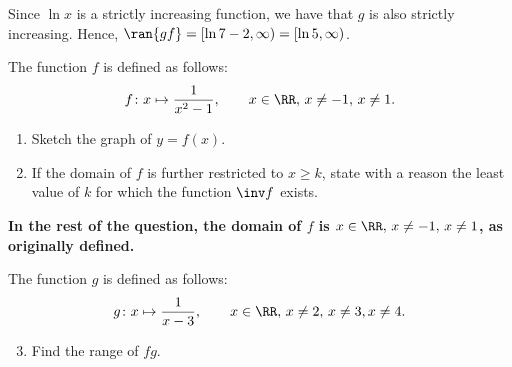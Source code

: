 \begin{solution}
\begin{ppart}
        Since $\ln x$ is a strictly increasing function, we have that $g$ is also strictly increasing. Hence, $\ran{gf} = [\ln{7 - 2}, \infty) = [\ln 5, \infty)$.
    \end{ppart}
\end{solution}

\begin{problem}
    The function $f$ is defined as follows: \[f \colon x \mapsto \frac1{x^2 - 1}, \qquad x \in \RR, \, x \neq -1, \, x \neq 1.\]

    \begin{enumerate}
        \item Sketch the graph of $y = f(x)$.
        \item If the domain of $f$ is further restricted to $x \geq k$, state with a reason the least value of $k$ for which the function $\inv f$ exists.
    \end{enumerate}

     \textbf{In the rest of the question, the domain of $f$ is $x \in \RR, \, x \neq -1, \, x \neq 1$, as originally defined.}

    \smallskip

    The function $g$ is defined as follows: \[g \colon x \mapsto \frac1{x-3}, \qquad x \in \RR, \, x \neq 2, \, x \neq 3, x \neq 4.\]

    \begin{enumerate}
        \setcounter{enumi}{2}
        \item Find the range of $fg$.
    \end{enumerate}
\end{problem}
